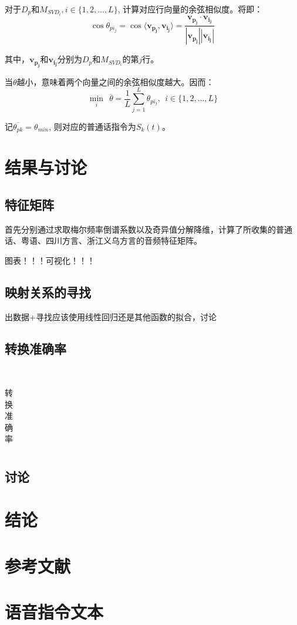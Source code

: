 \documentclass[lang=cn,cite=super]{elegantpaper}
\begin{document}
对于$D_p$和$M_{SVD_i}, i \in \{ 1,2,\ldots, L\}$, 计算对应行向量的余弦相似度。将即：
\begin{equation}
    \cos \theta_{pi_{j}} = \cos \langle \bm{v_{p_j}},\bm{v_{i_j}} \rangle = \frac{\bm{v_{p_j}} \cdot \bm{v_{i_j}}}{|\bm{v_{p_j}}||\bm{v_{i_j}}|}
\end{equation}

其中，$\bm{v_{p_j}}$和$\bm{v_{i_j}}$分别为$D_p$和$M_{SVD_i}$的第$j$行。

当$\theta$越小，意味着两个向量之间的余弦相似度越大。因而：
\begin{equation}
    \mathop{\min}_{i} ~~\overline{\theta} = \dfrac{1}{L} \sum_{j=1}^{L} \theta_{pi_{j}}, ~~i \in \{1,2,\ldots, L\}
\end{equation}

记$\overline{\theta_{pk}} = \theta_{min}$, 则对应的普通话指令为$S_k(t)$。
\section{结果与讨论}
\subsection{特征矩阵}
首先分别通过求取梅尔频率倒谱系数以及奇异值分解降维，计算了所收集的普通话、粤语、四川方言、浙江义乌方言的音频特征矩阵。


图表！！！可视化！！！
\subsection{映射关系的寻找}
出数据+寻找应该使用线性回归还是其他函数的拟合，讨论
\subsection{转换准确率}
\begin{table}[h]
    \caption{\label{tab:3} 转换准确率}\
    \begin{center}
        \begin{tabular}{cc}
            \hline
            \hline
        \end{tabular}
    \end{center}
\end{table}
\subsection{讨论}

\section{结论}

\section{参考文献}
\appendix
\section{语音指令文本}
\label{appendix:A}
\end{document}
